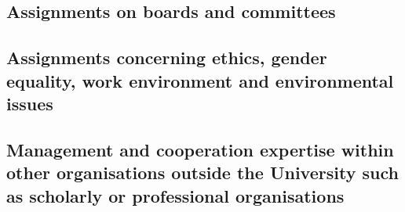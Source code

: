 \subsection{Assignments on boards and committees} \label{ssec:assignments-on-boards-and-committees}
\subsection{Assignments concerning ethics, gender equality, work environment and environmental issues} \label{ssec:assignments-concerning-ethics-gender-equality-work-environment-and-environmental-issues}
\subsection{Management and cooperation expertise within other organisations outside the University such as scholarly or professional organisations} \label{ssec:management-and-cooperation-expertise-within-other-organisations-outside-the-university-such-as-scholarly-or-professional-organisations}
